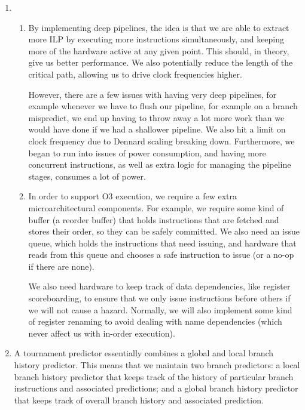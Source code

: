 


\begin{enumerate}[label=(\alph*)]
  \item
    \begin{enumerate}[label=(\roman*)]
      \item

        By implementing deep pipelines, the idea is that we are able to extract more ILP by executing more instructions simultaneously, and keeping more of the hardware active at any given point. This should, in theory, give us better performance. We also potentially reduce the length of the critical path, allowing us to drive clock frequencies higher.

        However, there are a few issues with having very deep pipelines, for example whenever we have to flush our pipeline, for example on a branch mispredict, we end up having to throw away a lot more work than we would have done if we had a shallower pipeline. We also hit a limit on clock frequency due to Dennard scaling breaking down. Furthermore, we began to run into issues of power consumption, and having more concurrent instructions, as well as extra logic for managing the pipeline stages, consumes a lot of power.

      \item
        In order to support O3 execution, we require a few extra microarchitectural components. For example, we require some kind of buffer (a reorder buffer) that holds instructions that are fetched and stores their order, so they can be safely committed. We also need an issue queue, which holds the instructions that need issuing, and hardware that reads from this queue and chooses a safe instruction to issue (or a no-op if there are none).

        We also need hardware to keep track of data dependencies, like register scoreboarding, to ensure that we only issue instructions before others if we will not cause a hazard. Normally, we will also implement some kind of register renaming to avoid dealing with name dependencies (which never affect us with in-order execution).
    \end{enumerate}

  \item
    \begin{enumerate}[label=(\roman*)]
      A tournament predictor essentially combines a global and local branch history predictor. This means that we maintain two branch predictors: a local branch history predictor that keeps track of the history of particular branch instructions and associated predictions; and a global branch history predictor that keeps track of overall branch history and associated prediction.


\end{enumerate}
\end{enumerate}
